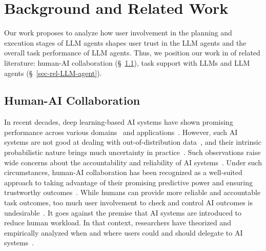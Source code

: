 \section{Background and Related Work}
Our work proposes to analyze how user involvement in the planning and execution stages of LLM agents shapes user trust in the LLM agents and the overall task performance of LLM agents. 
Thus, we position our work in  of related literature: human-AI collaboration (\S~\ref{sec-rel-collaboration-LLM}),  task support with LLMs and LLM agents (\S~\ref{sec-rel-LLM-agent}). %


\subsection{Human-AI Collaboration}
\label{sec-rel-collaboration-LLM}

In recent decades, deep learning-based AI systems have shown promising performance across various domains~\cite{yang2022survey,fernando2021deep} and applications~\cite{pouyanfar2018survey,dong2021survey}. 
However, such AI systems are not good at dealing with out-of-distribution data~\cite{jia2017adversarial,mccoy-etal-2019-right}, and their intrinsic probabilistic nature brings much uncertainty in %
practice~\cite{ghahramani2015probabilistic}. 
Such observations raise wide concerns about the accountability and reliability of AI systems~\cite{kaur2022trustworthy}. 
Under such circumstances, human-AI collaboration has been recognized as a well-suited approach %
to taking advantage of their promising predictive power and ensuring trustworthy outcomes~\cite{lai2021towards,jiang2021supporting}. 
While humans can provide more reliable and accountable task outcomes, too much user involvement to check and control AI outcomes is undesirable~\cite{lai2022human}. 
It goes against the premise that AI systems are introduced to reduce human workload. 
In that context, researchers have theorized and empirically analyzed when and where users could and should delegate to AI systems~\cite{lai2022human,lubars2019ask}. 

